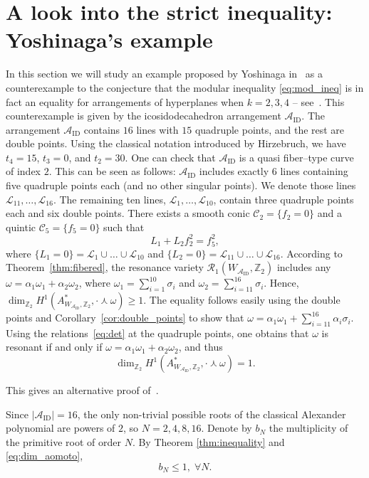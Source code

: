 \documentclass[11pt]{amsart}
\newcommand{\ID}{\textrm {ID}}
\def\cC{\mathcal{C}}
\def\cL{\mathcal{L}}
\def\cR{{\mathcal R}}
\def\cA{{\mathcal A}}
\def\ZZ{\mathbb{Z}}
\def\w{\omega}
\theoremstyle{plain}
\theoremstyle{definition}
\begin{document}
\section{A look into the strict inequality: Yoshinaga's example}
\label{sec:Yoshinaga}
In this section we will study an example proposed by Yoshinaga in~\cite{Y} as a counterexample to the conjecture that the modular inequality \eqref{eq:mod_ineq} is in fact an equality for arrangements of hyperplanes when $k=2,3,4$ -- see~\cite[Conjecture 1.9]{PS3}. This counterexample is given by the icosidodecahedron arrangement $\cA_{\ID}$. The arrangement $\cA_{\ID}$ contains $16$ lines with $15$ quadruple points, and the rest are double points. Using the classical notation introduced by Hirzebruch, we have $t_4=15$, $t_3=0$, and $t_2=30$. One can check that $\cA_{\ID}$ is a quasi fiber--type curve of index $2$. This can be seen as follows: $\cA_{\ID}$ includes exactly 6 lines containing five quadruple points each (and no other singular points). We denote those lines $\cL_{11}, \ldots,\cL_{16}$. The remaining ten lines, $\cL_1, \ldots ,\cL_{10}$, contain three quadruple points each and six double points. There exists a smooth conic $\cC_2=\{f_2=0\}$ and a quintic $\cC_5=\{f_5=0\}$ such that
\begin{equation}
\label{eq:YoshinagaToric}
L_1+L_2f_2^2=f_5^2,
\end{equation}
where $\{L_1=0\}=\cL_1\cup \ldots \cup\cL_{10}$ and $\{L_2=0\}=\cL_{11}\cup \ldots \cup\cL_{16}$. According to Theorem~\ref{thm:fibered}, the resonance variety $\cR_1(W_{\cA_{\ID}},\ZZ_2)$ includes any $\w=\alpha_1\w_1+\alpha_2\w_2$, where $\w_1=\sum_{i=1}^{10} \sigma_i$ and $\w_2=\sum_{i=11}^{16} \sigma_i$. Hence, $\dim_{\ZZ_2} H^1(A^*_{W_{\cA_{\ID}},\ZZ_2},\cdot \curlywedge \w)\geq 1$.
The equality follows easily using the double points and Corollary~\ref{cor:double_points} to show that $\w=\alpha_1\w_1+\sum_{i=11}^{16} \alpha_i\sigma_i$. Using the relations~\eqref{eq:det} at the quadruple points, one obtains that $\w$ is resonant if and only if $\w=\alpha_1\w_1+\alpha_2\w_2$, and thus 
\begin{equation}
\label{eq:dim_aomoto}
    \dim_{\ZZ_2} H^1(A^*_{W_{\cA_{\ID}},\ZZ_2},\cdot \curlywedge \w)=1.
\end{equation}

This gives an alternative proof of~\cite[Proposition 4.2]{Y}. 

Since $|\cA_{\ID}|=16$, the only non-trivial possible roots of the classical Alexander polynomial are powers of $2$, so $N = 2,4,8,16$. Denote by $b_N$ the multiplicity of the primitive root of order $N$. By Theorem \ref{thm:inequality} and \eqref{eq:dim_aomoto}, 
$$b_N \leq 1,\; \forall N.$$
\end{document}
